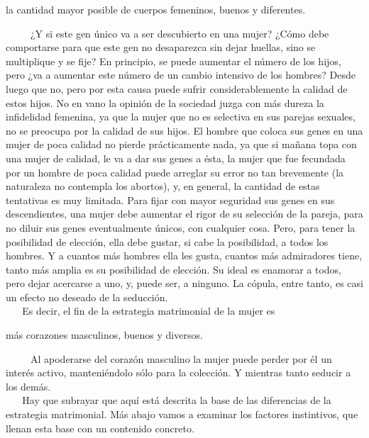 \begin{tcolorbox}
 la cantidad mayor posible de cuerpos femeninos, buenos y
diferentes.
\end{tcolorbox}
%
~ ~ ~ ¿Y si este gen único va a ser descubierto en una mujer? ¿Cómo debe
comportarse para que este gen no desaparezca sin dejar huellas, sino se
multiplique y se fije? En principio, se puede aumentar el número de los
hijos, pero ¿va a aumentar este número de un cambio intensivo de los
hombres? Desde luego que no, pero por esta causa puede sufrir
considerablemente la calidad de estos hijos. No en vano la opinión de la
sociedad juzga con más dureza la infidelidad femenina, ya que la mujer
que no es selectiva en sus parejas sexuales, no se preocupa por la
calidad de sus hijos. El hombre que coloca sus genes en una mujer de
poca calidad no pierde prácticamente nada, ya que si mañana topa con una
mujer de calidad, le va a dar sus genes a ésta, la mujer que fue
fecundada por un hombre de poca calidad puede arreglar su error no tan
brevemente (la naturaleza no contempla los abortos), y, en general, la
cantidad de estas tentativas es muy limitada. Para fijar con mayor
seguridad sus genes en sus descendientes, una mujer debe aumentar el
rigor de su selección de la pareja, para no diluir sus genes
eventualmente únicos, con cualquier cosa. Pero, para tener la
posibilidad de elección, ella debe gustar, si cabe la posibilidad, a
todos los hombres. Y a cuantos más hombres ella les gusta, cuantos más
admiradores tiene, tanto más amplia es su posibilidad de elección. Su
ideal es enamorar a todos, pero dejar acercarse a uno, y, puede ser, a
ninguno. La cópula, entre tanto, es casi un efecto no deseado de la
seducción.\\
\hspace*{0.333em} ~ ~ Es decir, el fin de la estrategia matrimonial de
la mujer es


\begin{tcolorbox}
 más corazones masculinos, buenos y diversos.
\end{tcolorbox}



~ ~ ~ Al apoderarse del corazón masculino la mujer puede perder por él
un interés activo, manteniéndolo sólo para la colección. Y mientras
tanto seducir a los demás.\\
\hspace*{0.333em} ~ ~ Hay que subrayar que aquí está descrita la base de
las diferencias de la estrategia matrimonial. Más abajo vamos a examinar
los factores instintivos, que llenan esta base con un contenido
concreto.

